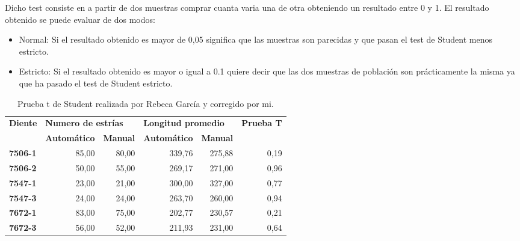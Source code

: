 Dicho test consiste en a partir de dos muestras comprar cuanta varia una de otra obteniendo un resultado entre 0 y 1. El resultado obtenido se puede evaluar de dos modos:
\begin{itemize}
\item Normal: Si el resultado obtenido es mayor de 0,05 significa que las muestras son parecidas y que pasan el test de Student menos estricto.
\item Estricto: Si el resultado obtenido es mayor o igual a 0.1 quiere decir que las dos muestras de población son prácticamente la misma ya que ha pasado el test de Student estricto.
\end{itemize} 

\begin{table}[]
\centering
\caption{Prueba t de Student realizada por Rebeca García \cite{Rebeca:garcia} y corregido por mi.}
\label{tab:estud}
\begin{tabular}{@{} lrrrrr @{}}
\toprule
\multirow{2}{*}{\textbf{Diente}} & \multicolumn{2}{l}{\textbf{Numero de estrías}} & \multicolumn{2}{l}{\textbf{Longitud promedio}} & \multirow{2}{*}{\textbf{Prueba T}} \\ \cline{2-5}
                                 & \textbf{Automático}      & \textbf{Manual}     & \textbf{Automático}      & \textbf{Manual}     &                                    \\ \midrule
\textbf{7506-1}                  & 85,00                    & 80,00               & 339,76                   & 275,88              & 0,19                               \\ \midrule
\textbf{7506-2}                  & 50,00                    & 55,00               & 269,17                   & 271,00              & 0,96                               \\ \midrule
\textbf{7547-1}                  & 23,00                    & 21,00               & 300,00                   & 327,00              & 0,77                               \\ \midrule
\textbf{7547-3}                  & 24,00                    & 24,00               & 263,70                   & 260,00              & 0,94                               \\ \midrule
\textbf{7672-1}                  & 83,00                    & 75,00               & 202,77                   & 230,57              & 0,21                               \\ \midrule
\textbf{7672-3}                  & 56,00                    & 52,00               & 211,93                   & 231,00              & 0,64                               \\ \midrule

\end{tabular}
\end{table}
